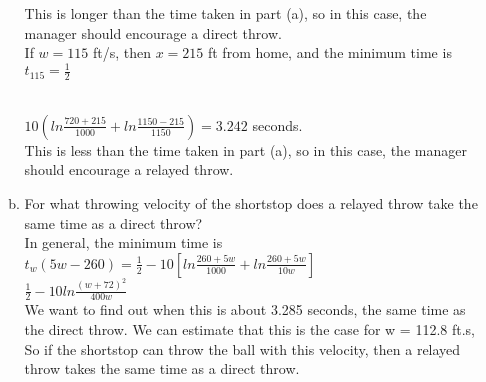 \documentclass[paper=a4, fontsize=11pt]{scrartcl}
\numberwithin{equation}{section}
\numberwithin{figure}{section}
\numberwithin{table}{section}
\begin{document}
\begin{enumerate}[1.]
\begin{enumerate}[(a)]
		This is longer than the time taken in part (a), so in this case, the manager should encourage a direct throw. \\
\medskip
		If $w = 115$ ft/s, then $x = 215$ ft from home, and the minimum time is $t_{115} = \frac{1}{2}$\\\

		$10(ln\frac{720+215}{1000} + ln\frac{1150-215}{1150}) = 3.242$ seconds. \\
\medskip
This is less than the time taken in part (a), so in this case, the manager should encourage a relayed throw.\\

\bigskip
		\item For what throwing velocity of the shortstop does a relayed throw take the same time as a direct throw? \\
		In general, the minimum time is\\
		$t_w(5w-260) = \frac{1}{2} - 10[ln\frac{260+5w}{1000} + ln\frac{260+5w}{10w}]$\\
		$\frac{1}{2} - 10ln\frac{(w+72)^2}{400w}$\\

\medskip
		We want to find out when this is about 3.285 seconds, the same time as the direct throw. We can estimate that this is the case for w = 112.8 ft.s, So if the shortstop can throw the ball with this 				velocity, then a relayed throw takes the same time as a direct throw.\\

\end{enumerate}
\end{enumerate}
\end{document}

